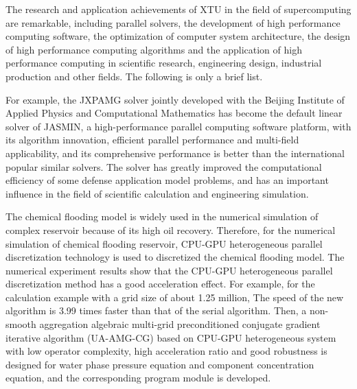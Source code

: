 
The research and application achievements of XTU in the field of supercomputing are remarkable, including parallel solvers, the development of high performance computing software, the optimization of computer system architecture, the design of high performance computing algorithms and the application of high performance computing in scientific research, engineering design, industrial production and other fields.
The following is only a brief list.

For example, the JXPAMG solver jointly developed with the Beijing Institute of Applied Physics and Computational Mathematics has become the default linear solver of JASMIN, a high-performance parallel computing software platform, with its algorithm innovation, efficient parallel performance and multi-field applicability, and its comprehensive performance is better than the international popular similar solvers. 
The solver has greatly improved the computational efficiency of some defense application model problems, and has an important influence in the field of scientific calculation and engineering simulation.

The chemical flooding model is widely used in the numerical simulation of complex reservoir because of its high oil recovery. 
Therefore, for the numerical simulation of chemical flooding reservoir, CPU-GPU heterogeneous parallel discretization technology is used to discretized the chemical flooding model. 
The numerical experiment results show that the CPU-GPU heterogeneous parallel discretization method has a good acceleration effect. 
For example, for the calculation example with a grid size of about 1.25 million, The speed of the new algorithm is 3.99 times faster than that of the serial algorithm. Then, a non-smooth aggregation algebraic multi-grid preconditioned conjugate gradient iterative algorithm (UA-AMG-CG) based on CPU-GPU heterogeneous system with low operator complexity, high acceleration ratio and good robustness is designed for water phase pressure equation and component concentration equation, and the corresponding program module is developed. 






